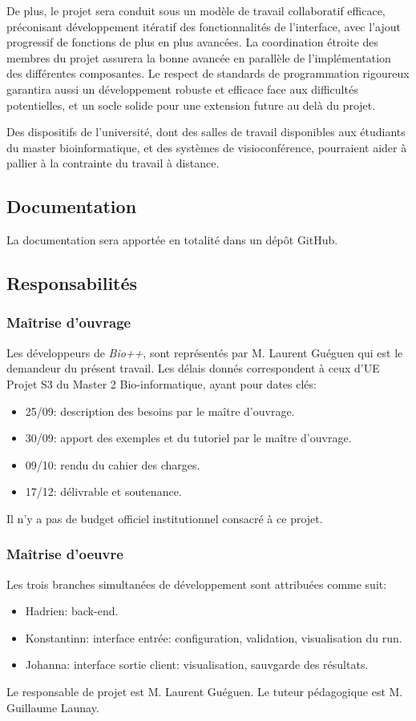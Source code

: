 De plus, le projet sera conduit
sous un modèle de travail collaboratif efficace,
préconisant développement itératif des fonctionnalités de l'interface,
avec l'ajout progressif de fonctions de plus en plus avancées.
La coordination étroite des membres du projet
assurera la bonne avancée en parallèle de l'implémentation des différentes composantes.
Le respect de standards de programmation rigoureux
garantira aussi un développement robuste et efficace face aux difficultés potentielles,
et un socle solide pour une extension future au delà du projet.

Des dispositifs de l'université,
dont des salles de travail disponibles aux étudiants du master bioinformatique,
et des systèmes de visioconférence,
pourraient aider à pallier à la contrainte du travail à distance.

 
\subsection{Documentation} 
La documentation sera apportée en totalité dans un dépôt GitHub.

	
\subsection{Responsabilités}
\subsubsection{Maîtrise d'ouvrage}
Les développeurs de \textit{Bio++}, sont représentés par M. Laurent Guéguen qui est le
 demandeur du présent travail. Les délais donnés correspondent à ceux d'UE
 Projet S3 du Master 2 Bio-informatique, ayant pour dates clés:
\begin{itemize}
	\item 25/09: description des besoins par le maître d'ouvrage.
	\item 30/09: apport des exemples et du tutoriel par le maître d'ouvrage.
	\item 09/10: rendu du cahier des charges.
	\item 17/12: délivrable et soutenance.
\end{itemize}
Il n'y a pas de budget officiel institutionnel consacré à ce projet. 

\subsubsection{Maîtrise d'oeuvre}

Les trois branches simultanées de développement sont attribuées comme suit:

\begin{itemize}
	\item Hadrien: back-end.
	\item Konstantinn: interface entrée: configuration, validation, visualisation du run.
	\item Johanna: interface sortie client: visualisation, sauvgarde des résultats.
\end{itemize}

Le responsable de projet est M. Laurent Guéguen.
Le tuteur pédagogique est M. Guillaume Launay.

%
